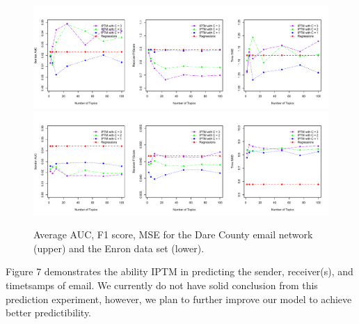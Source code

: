 \begin{figure}[ht]
	\centering
	\includegraphics[width=1\textwidth]{plots/Dare_PPE_35.pdf}  
	\includegraphics[width=1\textwidth]{plots/Enron_PPE_full.pdf}  
	\label{fig:PPE}	
	\caption{Average AUC, F1 score, MSE for the Dare County email network (upper) and the Enron data set (lower).}
\end{figure}
Figure 7 demonstrates the ability IPTM in predicting the sender, receiver(s), and timetsamps of email. We currently do not have solid conclusion from this prediction experiment, however, we plan to further improve our model to achieve better predictibility.
